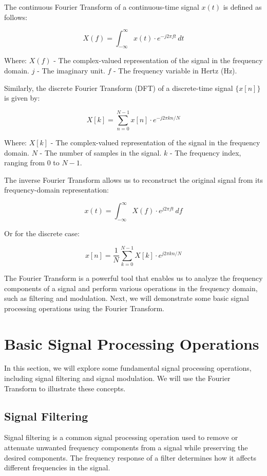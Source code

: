 \documentclass{article}
\begin{document}
The continuous Fourier Transform of a continuous-time signal $x(t)$ is defined as follows:

\begin{equation}
X(f) = \int_{-\infty}^{\infty} x(t) \cdot e^{-j2\pi ft} \, dt
\end{equation}

Where:
$X(f)$ - The complex-valued representation of the signal in the frequency domain.
$j$ - The imaginary unit.
$f$ - The frequency variable in Hertz (Hz).

Similarly, the discrete Fourier Transform (DFT) of a discrete-time signal $\{x[n]\}$ is given by:

\begin{equation}
X[k] = \sum_{n=0}^{N-1} x[n] \cdot e^{-j2\pi kn/N}
\end{equation}

Where:
$X[k]$ - The complex-valued representation of the signal in the frequency domain.
$N$ - The number of samples in the signal.
$k$ - The frequency index, ranging from 0 to $N-1$.

The inverse Fourier Transform allows us to reconstruct the original signal from its frequency-domain representation:

\begin{equation}
x(t) = \int_{-\infty}^{\infty} X(f) \cdot e^{j2\pi ft} \, df
\end{equation}

Or for the discrete case:

\begin{equation}
x[n] = \frac{1}{N} \sum_{k=0}^{N-1} X[k] \cdot e^{j2\pi kn/N}
\end{equation}

The Fourier Transform is a powerful tool that enables us to analyze the frequency components of a signal and perform various operations in the frequency domain, such as filtering and modulation. Next, we will demonstrate some basic signal processing operations using the Fourier Transform.

\section{Basic Signal Processing Operations}
In this section, we will explore some fundamental signal processing operations, including signal filtering and signal modulation. We will use the Fourier Transform to illustrate these concepts.

\subsection{Signal Filtering}
Signal filtering is a common signal processing operation used to remove or attenuate unwanted frequency components from a signal while preserving the desired components. The frequency response of a filter determines how it affects different frequencies in the signal.
\end{document}
